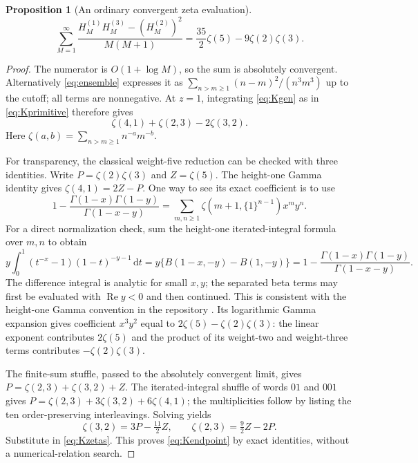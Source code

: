 \documentclass[11pt,letterpaper]{article}
\numberwithin{equation}{section}
\newtheorem{proposition}[theorem]{Proposition}
\theoremstyle{definition}\newtheorem{definition}[theorem]{Definition}
\theoremstyle{remark}\newtheorem{remark}[theorem]{Remark}
\newcommand{\dd}{\,\mathrm d}\newcommand{\Li}{\operatorname{Li}}
\begin{document}
\begin{proposition}[An ordinary convergent zeta evaluation]
\label{thm:Kendpoint}
\begin{equation}\label{eq:Kendpoint}
 \boxed{\displaystyle
 \sum_{M=1}^{\infty}
 \frac{H_M^{(1)}H_M^{(3)}-(H_M^{(2)})^2}{M(M+1)}
           =\frac{35}{2}\zeta(5)-9\zeta(2)\zeta(3).}
\end{equation}
\end{proposition}
\begin{proof}
The numerator is $O(1+\log M)$, so the sum is absolutely convergent.
Alternatively \eqref{eq:ensemble} expresses it as
$\sum_{n>m\ge1}(n-m)^2/(n^3m^3)$ up to the cutoff; all terms are
nonnegative. At $z=1$, integrating \eqref{eq:Kgen} as in
\eqref{eq:Kprimitive} therefore gives
\begin{equation}\label{eq:Kzetas}
                  \zeta(4,1)+\zeta(2,3)-2\zeta(3,2).
\end{equation}
Here $\zeta(a,b)=\sum_{n>m\ge1}n^{-a}m^{-b}$.

For transparency, the classical weight-five reduction can be checked
with three identities. Write $P=\zeta(2)\zeta(3)$ and $Z=\zeta(5)$.
The height-one Gamma identity gives
$\zeta(4,1)=2Z-P$. One way to see its exact coefficient is to use
\begin{equation}\label{eq:heightone}
 1-\frac{\Gamma(1-x)\Gamma(1-y)}{\Gamma(1-x-y)}
 =\sum_{m,n\ge1}\zeta(m+1,\{1\}^{n-1})x^my^n.
\end{equation}
For a direct normalization check, sum the height-one iterated-integral
formula over $m,n$ to obtain
\[
 y\int_0^1(t^{-x}-1)(1-t)^{-y-1}\dd t
   =y\{B(1-x,-y)-B(1,-y)\}
   =1-\frac{\Gamma(1-x)\Gamma(1-y)}{\Gamma(1-x-y)}.
\]
The difference integral is analytic for small $x,y$; the separated beta
terms may first be evaluated with $\operatorname{Re}y<0$ and then
continued. This is consistent with the height-one Gamma convention in
the repository \cite{harmonic}. Its logarithmic
Gamma expansion gives coefficient $x^3y^2$ equal to
$2\zeta(5)-\zeta(2)\zeta(3)$: the linear exponent contributes $2\zeta(5)$
and the product of its weight-two and weight-three terms contributes
$-\zeta(2)\zeta(3)$.

The finite-sum stuffle, passed to the absolutely convergent limit, gives
$P=\zeta(2,3)+\zeta(3,2)+Z$. The iterated-integral shuffle of words
$01$ and $001$ gives
$P=\zeta(2,3)+3\zeta(3,2)+6\zeta(4,1)$; the multiplicities follow by
listing the ten order-preserving interleavings. Solving yields
\[
 \zeta(3,2)=3P-\tfrac{11}{2}Z,\qquad
 \zeta(2,3)=\tfrac92Z-2P.
\]
Substitute in \eqref{eq:Kzetas}. This proves \eqref{eq:Kendpoint} by
exact identities, without a numerical-relation search.
\end{proof}
\end{document}
